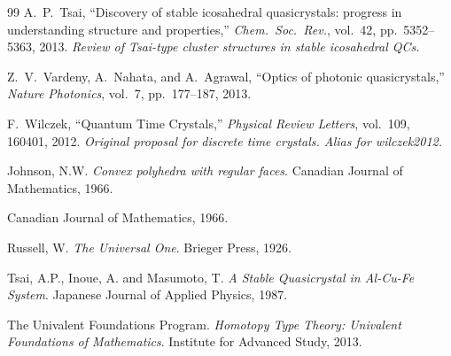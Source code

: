 \begin{thebibliography}{99}
A.~P.~Tsai,
``Discovery of stable icosahedral quasicrystals: progress in understanding structure and properties,''
\emph{Chem.\ Soc.\ Rev.}, vol.~42, pp.~5352--5363, 2013.
\textit{Review of Tsai-type cluster structures in stable icosahedral QCs.}

Z.~V.~Vardeny, A.~Nahata, and A.~Agrawal,
``Optics of photonic quasicrystals,''
\emph{Nature Photonics}, vol.~7, pp.~177--187, 2013.

F.~Wilczek,
``Quantum Time Crystals,''
\emph{Physical Review Letters}, vol.~109, 160401, 2012.
\textit{Original proposal for discrete time crystals. Alias for wilczek2012.}

Johnson, N.W.
\newblock \emph{Convex polyhedra with regular faces}.
\newblock Canadian Journal of Mathematics, 1966.

\newblock Canadian Journal of Mathematics, 1966.

Russell, W.
\newblock \emph{The Universal One}.
\newblock Brieger Press, 1926.

Tsai, A.P., Inoue, A. and Masumoto, T.
\newblock \emph{A Stable Quasicrystal in Al-Cu-Fe System}.
\newblock Japanese Journal of Applied Physics, 1987.

The Univalent Foundations Program.
\newblock \emph{Homotopy Type Theory: Univalent Foundations of Mathematics}.
\newblock Institute for Advanced Study, 2013.

\end{thebibliography}
